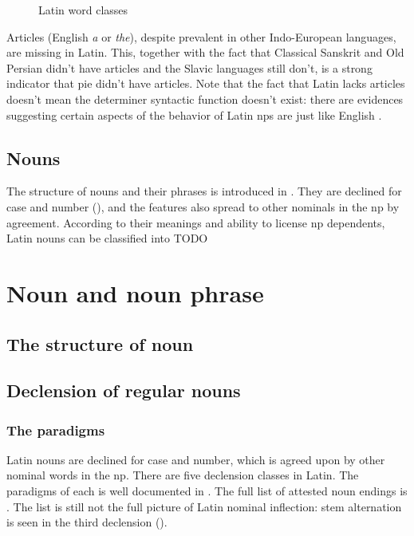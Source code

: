 \documentclass[a4paper, oneside]{report}
\newcommand*{\citepage}[1]{p.~{#1}}
\newcommand{\form}[1]{\emph{#1}}
\begin{document}
\begin{sidewaysfigure}
    \centering
    
    \caption{Latin word classes}
    \label{fig:latin-word-class}
\end{sidewaysfigure}

Articles (English \form{a} or \form{the}), 
despite prevalent in other Indo-European languages,
are missing in Latin.
This, together with the fact that Classical Sanskrit and Old Persian didn't have articles 
and the Slavic languages still don't,
is a strong indicator that \ac{pie} didn't have articles. 
Note that the fact that Latin lacks articles 
doesn't mean the determiner syntactic function doesn't exist:
there are evidences suggesting certain aspects of the behavior of Latin \acs{np}s 
are just like English \citep{giusti2014split}.

\section{Nouns}

The structure of nouns and their phrases is introduced in .
They are declined for case and number (),
and the features also spread to other nominals in the \acs{np} by agreement.
According to their meanings and ability to license \acs{np} dependents, 
Latin nouns can be classified into TODO 

\chapter{Noun and noun phrase}\label{sec:np}

\section{The structure of noun}

\section{Declension of regular nouns}\label{sec:regular-noun-declension}

\subsection{The paradigms}

Latin nouns are declined for case and number,
which is agreed upon by other nominal words in the \acs{np}.
There are five declension classes in Latin.
The paradigms of each is well documented in \citet[\citepage{17}]{allen1903allen}.
The full list of attested noun endings is .
The list is still not the full picture of Latin nominal inflection:
stem alternation is seen in the third declension
().
\end{document}
